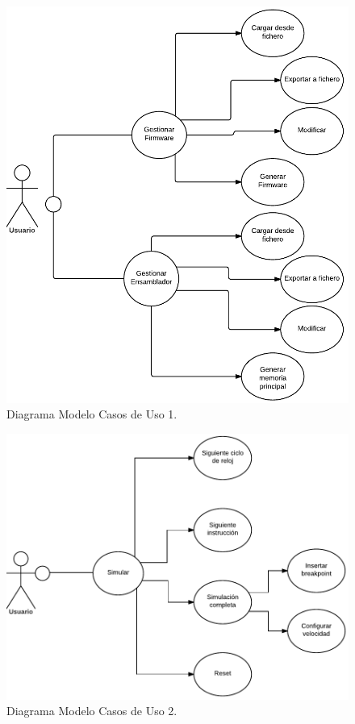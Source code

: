 \begin{figure}[htbp]
 	\centering
 	\includegraphics[width=14cm]{figures/user_cases_1}
 	\caption{Diagrama Modelo Casos de Uso 1.}
	\label{fig:user_cases1}
\end{figure}

\vspace{20 mm}

\begin{figure}[htbp]
 	\centering
 	\includegraphics[width=15cm]{figures/user_cases_2}
 	\caption{Diagrama Modelo Casos de Uso 2.}
	\label{fig:user_cases2}
\end{figure}

